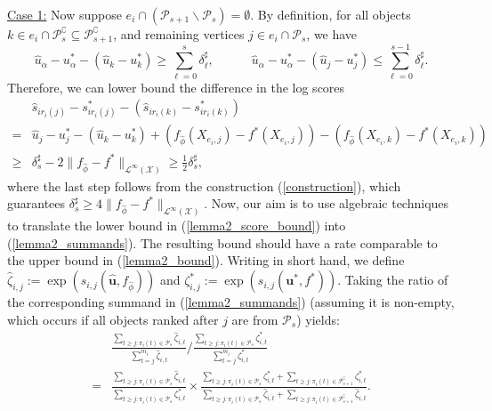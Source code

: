 \documentclass[
  12pt]{article}
\begin{document}
\underline{Case 1:} Now suppose $e_i \cap\left(\mathcal{P}_{s+1} \backslash \mathcal{P}_s\right)=\emptyset$. By definition, for all objects $k \in e_i \cap \mathcal{P}_s^{\complement} \subseteq \mathcal{P}_{s+1}^{\complement}$, and remaining vertices $j \in e_i \cap \mathcal{P}_s$, we have
\begin{equation}
\widehat{u}_\alpha-u_\alpha^*-\left(\widehat{u}_k-u_k^*\right) \geq \sum_{\ell=0}^{s}\delta^\sharp_{\ell}, \quad\quad\quad
\widehat{u}_\alpha-u_\alpha^*-\left(\widehat{u}_j-u_j^*\right) \leq\sum_{\ell=0}^{s-1}\delta^\sharp_{\ell}.
\end{equation}
Therefore, we can lower bound the difference in the log scores
\begin{align}
&\widehat{s}_{i r_i(j)}-s_{i r_i(j)}^*-\left(\widehat{s}_{i r_i(k)}-s_{i r_i(k)}^*\right) \nonumber\\
=&\widehat{u}_j-u_j^*-(\widehat{u}_k-u_k^*)+(f_{\widehat{\phi}}(X_{e_i, j})-f^*(X_{e_i, j}))-(f_{\widehat{\phi}}(X_{e_i, k})-f^*(X_{e_i, k}))\nonumber\\
 \geq& \delta^\sharp_s -2 \|f_{\widehat{\phi}}-f^*\|_{\mathcal{L}^\infty(\mathcal{X})} \geq \frac{1}{2} \delta^\sharp_s, \label{lemma2_score_bound}
\end{align}
\noindent where the last step follows from the construction (\ref{construction}), which guarantees $\delta^\sharp_s\geq 4\|f_{\widehat{\phi}}-f^*\|_{\mathcal{L}^\infty(\mathcal{X})}$. Now, our aim is to use algebraic techniques to translate the lower bound in (\ref{lemma2_score_bound}) into  (\ref{lemma2_summands}). The resulting bound should have a rate comparable to the upper bound in (\ref{lemma2_bound}). Writing in short hand, we define $\widehat{\zeta}_{i,j}:=\exp(s_{i,j}(\widehat{\boldsymbol{u}},f_{\widehat{\phi}}))$ and $\zeta^*_{i,j}:=\exp(s_{i,j}(\boldsymbol{u}^*,f^*))$. Taking the ratio of the corresponding summand in (\ref{lemma2_summands}) (assuming it is non-empty, which occurs if all objects ranked after $j$ are from $\mathcal{P}_s$) yields:
\begin{equation*}
\begin{aligned}
& \frac{\sum_{t \geq j: \pi_i(t) \in \mathcal{P}_{s}} \widehat{\zeta}_{i,t}}{\sum_{t=j}^{m_i} \widehat{\zeta}_{i,t}} \bigg/ \frac{\sum_{t \geq j: \pi_i(t) \in \mathcal{P}_{s}} \zeta^*_{i,t}}{\sum_{t=j}^{m_i} \zeta^*_{i,t}} \\
= & \frac{\sum_{t \geq j: \pi_i(t) \in \mathcal{P}_{s}} \widehat{\zeta}_{i,t}}{\sum_{t \geq j: \pi_i(t) \in \mathcal{P}_{s}} \zeta^*_{i,t}} \times \frac{\sum_{t \geq j: \pi_i(t) \in \mathcal{P}_{s}} \zeta^*_{i,t}+\sum_{t \geq j: \pi_i(t) \in \mathcal{P}_{s+1}^\complement} \zeta^*_{i,t}}{\sum_{t \geq j: \pi_i(t) \in \mathcal{P}_{s}} \widehat{\zeta}_{i,t}+\sum_{t \geq j: \pi_i(t) \in \mathcal{P}_{s+1}^\complement} \widehat{\zeta}_{i,t}}.
\end{aligned}
\end{equation*}
\end{document}
